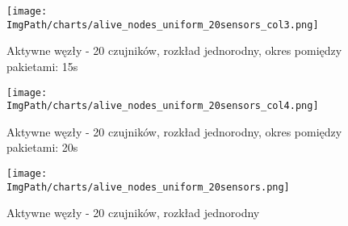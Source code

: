 \begin{figure}[!htbp]
	\begin{center}
		\texttt{[image: \\ImgPath/charts/alive\_nodes\_uniform\_20sensors\_col3.png]}
	\end{center}
	\caption{Aktywne węzły - 20 czujników, rozkład jednorodny, okres pomiędzy pakietami: 15s}
\end{figure}

\begin{figure}[!htbp]
	\begin{center}
		\texttt{[image: \\ImgPath/charts/alive\_nodes\_uniform\_20sensors\_col4.png]}
	\end{center}
	\caption{Aktywne węzły - 20 czujników, rozkład jednorodny, okres pomiędzy pakietami: 20s}
\end{figure}

\begin{figure}[!htbp]
	\begin{center}
		\texttt{[image: \\ImgPath/charts/alive\_nodes\_uniform\_20sensors.png]}
	\end{center}
	\caption{Aktywne węzły - 20 czujników, rozkład jednorodny}
\end{figure}